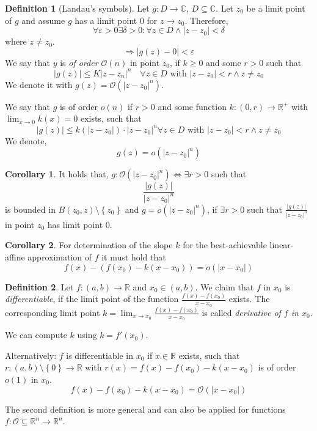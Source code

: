 \documentclass[a4paper,landscape,twocolumn]{article}
\theoremstyle{definition}
\newtheorem{defi}{Definition}
\newtheorem{cor}{Corollary}
\newcommand\set[1]{\left\{#1\right\}}
\newcommand\abs[1]{\left|#1\right|}
\begin{document}
\begin{defi}[Landau's symbols]
  Let $g: D \to \mathbb C$, $D \subseteq \mathbb C$.
  Let $z_0$ be a limit point of $g$ and assume $g$ has a limit point $0$ for $z \to z_0$.
  Therefore,
  \[ \forall \varepsilon > 0 \exists \delta > 0: \forall z \in D \land \abs{z - z_0} < \delta \]
  where $z \neq z_0$.
  \[ \Rightarrow \abs{g(z) - 0} < \varepsilon \]
  We say that $y$ is \emph{of order $\mathcal{O}(n)$} in point $z_0$,
  if $k \geq 0$ and some $r > 0$ such that
  \[ \abs{g(z)} \leq K \abs{z - z_n}^n \quad\forall z \in D \text{ with } \abs{z - z_0} < r \land z \neq z_0 \]
  We denote it with $g(z) = \mathcal O(\abs{z - z_0}^n)$.

  We say that $g$ is of order $o(n)$ if $r > 0$ and some function $k: (0, r) \to \mathbb R^+$
  with $\lim_{x\to 0} k(x) = 0$ exists, such that
  \[
    \abs{g(z)} \leq k(\abs{z - z_0}) \cdot \abs{z - z_0}^n
    \forall z \in D \text{ with } \abs{z - z_0} < r \land z \neq z_0
  \]
  We denote,
  \[ g(z) = o(\abs{z - z_0}^n) \]
\end{defi}
\begin{cor}
  It holds that,
  $g: \mathcal O(\abs{z - z_0}^n) \Leftrightarrow \exists r > 0$ such that
  \[ \frac{\abs{g(z)}}{\abs{z - z_0}^n} \]
  is bounded in $B(z_0, z) \setminus \set{z_0}$ and $g = o(\abs{z - z_0}^n)$,
  if $\exists r > 0$ such that $\frac{\abs{g(z)}}{\abs{z - z_0}^n}$ in point
  $z_0$ has limit point $0$.
\end{cor}
\begin{cor}
  For determination of the slope $k$ for the best-achievable linear-affine approximation
  of $f$ it must hold that
  \[ f(x) - (f(x_0) - k (x - x_0)) = o(\abs{x - x_0}) \]
\end{cor}
\begin{defi}
  Let $f: (a, b) \to \mathbb R$ and $x_0 \in (a, b)$. We claim that $f$ in $x_0$
  is \emph{differentiable}, if the limit point of the function $\frac{f(x) - f(x_0)}{x - x_0}$
  exists. The corresponding limit point $k = \lim_{x\to x_0} \frac{f(x) - f(x_0)}{x - x_0}$
  is called \emph{derivative of $f$ in $x_0$}.

  We can compute $k$ using $k = f'(x_0)$.

  Alternatively: $f$ is differentiable in $x_0$ if $x \in \mathbb R$ exists,
  such that
  $r: (a, b) \setminus \set{0} \to \mathbb R$
  with
  $r(x)  = f(x) - f(x_0) - k(x - x_0)$
  is of order $o(1)$ in $x_0$.
  \[ f(x) - f(x_0) - k(x - x_0) = \mathcal O(\abs{x - x_0}) \]

  The second definition is more general and can also be applied for functions
  $f: \mathcal O \subseteq \mathbb R^n \to \mathbb R^n$.
\end{defi}
\end{document}
